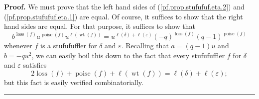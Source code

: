 \documentclass[numbers=enddot,12pt,final,onecolumn,notitlepage]{scrartcl}%
\theoremstyle{definition}
\newenvironment{proof}[1][Proof]{\noindent\textbf{#1.} }{\ \rule{0.5em}{0.5em}}
\begin{document}
\begin{proof}
We must prove that the left hand sides of (\ref{pf.prop.stufufuf.eta.2}) and
(\ref{pf.prop.stufufuf.eta.1}) are equal. Of course, it suffices to show that
the right hand sides are equal. For that purpose, it suffices to show that%
\[
b^{\operatorname*{loss}\left(  f\right)  }a^{\operatorname*{poise}\left(
f\right)  }u^{\ell\left(  \operatorname*{wt}\left(  f\right)  \right)
}=u^{\ell\left(  \delta\right)  +\ell\left(  \varepsilon\right)  }\left(
-q\right)  ^{\operatorname*{loss}\left(  f\right)  }\left(  q-1\right)
^{\operatorname*{poise}\left(  f\right)  }%
\]
whenever $f$ is a stufufuffler for $\delta$ and $\varepsilon$. Recalling that
$a=\left(  q-1\right)  u$ and $b=-qu^{2}$, we can easily boil this down to the
fact that every stufufuffler $f$ for $\delta$ and $\varepsilon$ satisfies%
\[
2\operatorname*{loss}\left(  f\right)  +\operatorname*{poise}\left(  f\right)
+\ell\left(  \operatorname*{wt}\left(  f\right)  \right)  =\ell\left(
\delta\right)  +\ell\left(  \varepsilon\right)  ;
\]
but this fact is easily verified combinatorially.
\end{proof}
\end{document}
